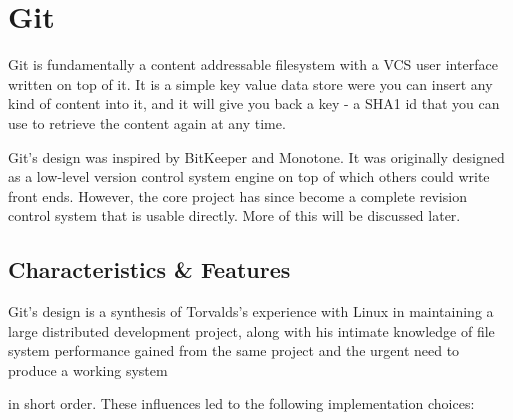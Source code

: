 \section{Git}

Git is fundamentally a content addressable filesystem with a VCS user
interface written on top of it. It is a simple key value data store
were you can insert any kind of content into it, and it will give you
back a key - a SHA1 id that you can use to retrieve the content again
at any time.

Git’s design was inspired by BitKeeper and Monotone\cite{inspiration}.
It was originally designed as a low-level version control system
engine on top of which others could write front ends. However, the
core project has since become a complete revision control system that
is usable directly. More of this will be discussed later.

\subsection{Characteristics \& Features}

Git’s design is a synthesis of Torvalds’s experience with Linux in
maintaining a large distributed development project, along with his
intimate knowledge of file system performance gained from the same
project and the urgent need to produce a working system

in short order. These influences led to the following implementation choices:

